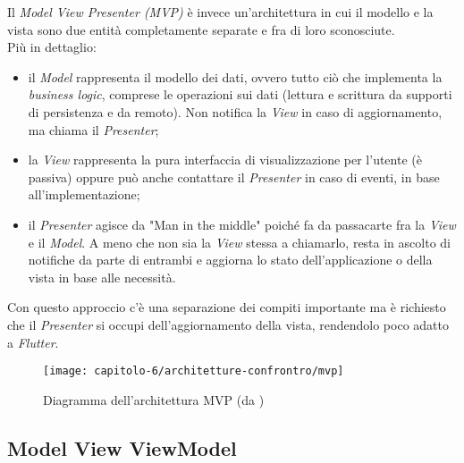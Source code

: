 Il \emph{Model View Presenter (MVP)} è invece un'architettura in cui il modello e la vista sono due entità completamente separate e fra di loro sconosciute.\\
Più in dettaglio:
\begin{itemize}
    \item il \emph{Model} rappresenta il modello dei dati, ovvero tutto ciò che implementa la \emph{business logic}, comprese le operazioni sui dati (lettura e scrittura da supporti di persistenza e da remoto). Non notifica la \emph{View} in caso di aggiornamento, ma chiama il \emph{Presenter};
    \item la \emph{View} rappresenta la pura interfaccia di visualizzazione per l'utente (è passiva) oppure può anche contattare il \emph{Presenter} in caso di eventi, in base all'implementazione;
    \item il \emph{Presenter} agisce da "Man in the middle" poiché fa da passacarte fra la \emph{View} e il \emph{Model}. A meno che non sia la \emph{View} stessa a chiamarlo, resta in ascolto di notifiche da parte di entrambi e aggiorna lo stato dell'applicazione o della vista in base alle necessità.
\end{itemize}
Con questo approccio c'è una separazione dei compiti importante ma è richiesto che il \emph{Presenter} si occupi dell'aggiornamento della vista, rendendolo poco adatto a \emph{Flutter}.

\begin{figure}[!h]
    \centering 
    \texttt{[image: capitolo-6/architetture-confrontro/mvp]} 
    \caption{Diagramma dell'architettura MVP (da \cite{site:mvp})}
\end{figure}

\subsection{Model View ViewModel}
\label{subsec:model-view-viewmodel}

